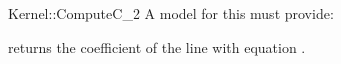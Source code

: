 \begin{ccRefFunctionObjectConcept}{Kernel::ComputeC_2}
A model for this must provide:


       {returns the coefficient  of the line with equation .}

\ccRefines
{}



\end{ccRefFunctionObjectConcept}
